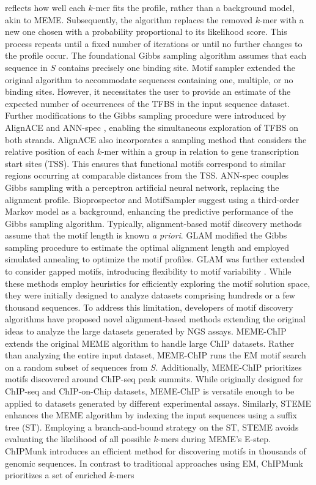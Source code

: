 \documentclass[a4paper, titlepage, openright]{book}
\begin{document}
reflects how well each $k$-mer fits the profile, rather than a background model, akin to MEME. Subsequently, the algorithm replaces the removed $k$-mer with a new one chosen with a probability proportional to its likelihood score. This process repeats until a fixed number of iterations or until no further changes to the profile occur. The foundational Gibbs sampling algorithm \citep{lawrence1990expectation} assumes that each sequence in $S$ contains precisely one binding site. Motif sampler \citep{neuwald1995gibbs} extended the original algorithm to accommodate sequences containing one, multiple, or no binding sites. However, it necessitates the user to provide an estimate of the expected number of occurrences of the TFBS in the input sequence dataset. Further modifications to the Gibbs sampling procedure were introduced by AlignACE \citep{hughes2000computational} and ANN-spec \citep{workman1999ann}, enabling the simultaneous exploration of TFBS on both strands. AlignACE also incorporates a sampling method that considers the relative position of each $k$-mer within a group in relation to gene transcription start sites (TSS). This ensures that functional motifs correspond to similar regions occurring at comparable distances from the TSS. ANN-spec couples Gibbs sampling with a perceptron artificial neural network, replacing the alignment profile. Bioprospector \citep{liu2000bioprospector} and MotifSampler \citep{thijs2001higher} suggest using a third-order Markov model as a background, enhancing the predictive performance of the Gibbs sampling algorithm. Typically, alignment-based motif discovery methods assume that the motif length is known \emph{a priori}. GLAM \citep{frith2004finding} modified the Gibbs sampling procedure to estimate the optimal alignment length and employed simulated annealing to optimize the motif profiles. GLAM was further extended to consider gapped motifs, introducing flexibility to motif variability \citep{frith2008discovering}. While these methods employ heuristics for efficiently exploring the motif solution space, they were initially designed to analyze datasets comprising hundreds or a few thousand sequences. To address this limitation, developers of motif discovery algorithms have proposed novel alignment-based methods extending the original ideas to analyze the large datasets generated by NGS assays. MEME-ChIP \citep{machanick2011meme} extends the original MEME algorithm to handle large ChIP datasets. Rather than analyzing the entire input dataset, MEME-ChIP runs the EM motif search on a random subset of sequences from $S$. Additionally, MEME-ChIP prioritizes motifs discovered around ChIP-seq peak summits. While originally designed for ChIP-seq and ChIP-on-Chip datasets, MEME-ChIP is versatile enough to be applied to datasets generated by different experimental assays. Similarly, STEME \citep{reid2011steme} enhances the MEME algorithm by indexing the input sequences using a suffix tree (ST). Employing a branch-and-bound strategy on the ST, STEME avoids evaluating the likelihood of all possible $k$-mers during MEME's E-step. ChIPMunk \citep{kulakovskiy2010deep} introduces an efficient method for discovering motifs in thousands of genomic sequences. In contrast to traditional approaches using EM, ChIPMunk prioritizes a set of enriched $k$-mers 
\end{document}
